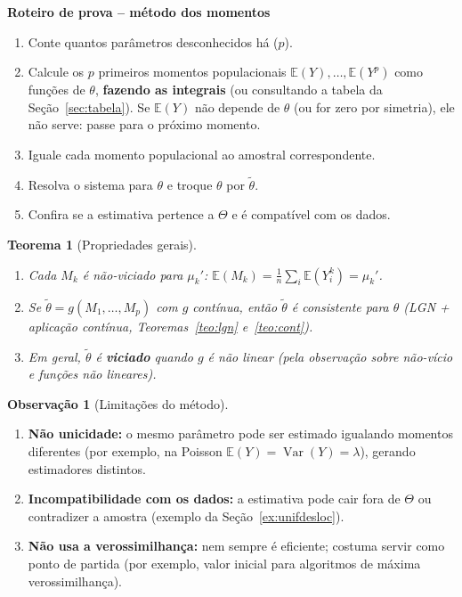 \documentclass[11pt,a4paper]{article}
\theoremstyle{definition}
\newtheorem{observacao}{Observação}[section]
\theoremstyle{plain}
\newtheorem{teorema}{Teorema}[section]
\newcommand{\E}{\mathbb{E}}
\newcommand{\Var}{\operatorname{Var}}
\begin{document}
\begin{mdframed}[linecolor=Gray,backgroundcolor=Gray!5]
\textbf{Roteiro de prova -- método dos momentos}
\begin{enumerate}[label=\arabic*.]
\item Conte quantos parâmetros desconhecidos há ($p$).
\item Calcule os $p$ primeiros momentos populacionais $\E(Y),\dots,\E(Y^p)$ como funções de $\theta$, \textbf{fazendo as integrais} (ou consultando a tabela da Seção~\ref{sec:tabela}). Se $\E(Y)$ não depende de $\theta$ (ou for zero por simetria), ele não serve: passe para o próximo momento.
\item Iguale cada momento populacional ao amostral correspondente.
\item Resolva o sistema para $\theta$ e troque $\theta$ por $\tilde\theta$.
\item Confira se a estimativa pertence a $\Theta$ e é compatível com os dados.
\end{enumerate}
\end{mdframed}

\begin{teorema}[Propriedades gerais]
\begin{enumerate}[label=(\roman*)]
\item Cada $M_k$ é não-viciado para $\mu_k'$: $\E(M_k)=\frac1n\sum_i\E(Y_i^k)=\mu_k'$.
\item Se $\tilde\theta=g(M_1,\dots,M_p)$ com $g$ contínua, então $\tilde\theta$ é consistente para $\theta$ (LGN + aplicação contínua, Teoremas~\ref{teo:lgn} e~\ref{teo:cont}).
\item Em geral, $\tilde\theta$ é \textbf{viciado} quando $g$ é não linear (pela observação sobre não-vício e funções não lineares).
\end{enumerate}
\end{teorema}

\begin{observacao}[Limitações do método]
\begin{enumerate}[label=(\alph*)]
\item \textbf{Não unicidade:} o mesmo parâmetro pode ser estimado igualando momentos diferentes (por exemplo, na Poisson $\E(Y)=\Var(Y)=\lambda$), gerando estimadores distintos.
\item \textbf{Incompatibilidade com os dados:} a estimativa pode cair fora de $\Theta$ ou contradizer a amostra (exemplo da Seção~\ref{ex:unifdesloc}).
\item \textbf{Não usa a verossimilhança:} nem sempre é eficiente; costuma servir como ponto de partida (por exemplo, valor inicial para algoritmos de máxima verossimilhança).
\end{enumerate}
\end{observacao}
\end{document}
